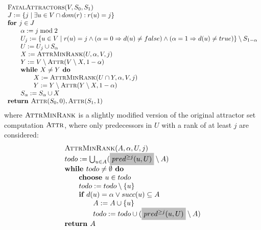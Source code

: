 \documentclass{article}
\begin{document}
\begin{equation*}
\begin{array}{l}
\text{\textsc{FatalAttractors}}(V, S_0, S_1)\\
J := \{ j \mid \exists u \in V \cap dom(r) : r(u) = j \} \\
\textbf{for } j \in J \\
\qquad \alpha := j \bmod 2\\
\qquad U_j := \{u \in V \mid r(u) = j \wedge (\alpha = 0 \Rightarrow d(u) \neq false) 
\wedge (\alpha = 1 \Rightarrow d(u) \neq true) \} \setminus S_{1 - \alpha} \\
\qquad U := U_j \cup S_\alpha\\
\qquad X := \textsc{AttrMinRank}(U, \alpha, V, j) \\
\qquad Y := V \setminus \textsc{Attr}(V \setminus X, 1-\alpha) \\
\qquad \textbf{while } X \neq Y \textbf{ do }\\
\qquad \qquad X := \textsc{AttrMinRank}(U \cap Y, \alpha, V, j) \\
\qquad \qquad Y := Y \setminus \textsc{Attr}(Y \setminus X, 1-\alpha) \\
\qquad S_\alpha := S_\alpha \cup X \\
\textbf{return } \textsc{Attr}(S_0, 0), \textsc{Attr}(S_1, 1)
\end{array}
\end{equation*}
where $\textsc{AttrMinRank}$ is a slightly modified version of the original attractor
set computation $\textsc{Attr}$, where only predecessors in $U$ with a rank of at least
$j$ are considered:
\begin{equation*}
\begin{array}{l}
\text{\textsc{AttrMinRank}}(A, \alpha, U, j) \\
todo := \bigcup_{u \in A} (%
\colorbox{lightgray}{$ pred^{\geq j}(u, U) $}%
\setminus A) \\
\textbf{while } todo \neq \emptyset \textbf{ do} \\
\qquad \textbf{choose } u \in todo \\
\qquad todo := todo \setminus \{u\} \\
\qquad \textbf{if } d(u) = \alpha \vee succ(u) \subseteq A \\
\qquad \qquad A := A \cup \{u \} \\
\qquad \qquad todo := todo \cup (%
\colorbox{lightgray}{$ pred^{\geq j}(u, U) $}%
\setminus A)  \\
\textbf{return } A
\end{array}
\end{equation*}
\end{document}
